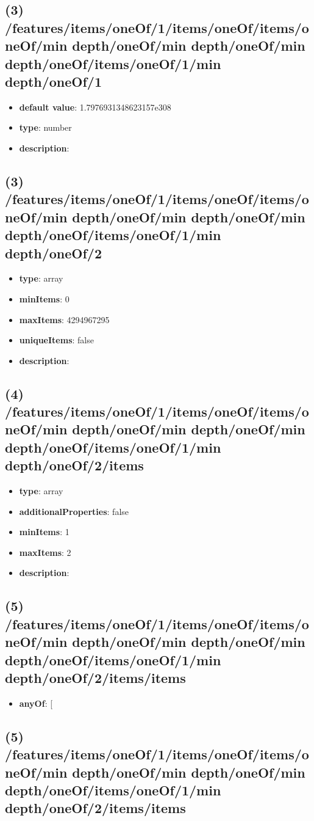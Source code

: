 \subsection{(3) /features/items/oneOf/1/items/oneOf/items/oneOf/min depth/oneOf/min depth/oneOf/min depth/oneOf/items/oneOf/1/min depth/oneOf/1}
\begin{itemize}[leftmargin=3em]\item {\bf default value}: 1.7976931348623157e308
\item {\bf type}: number
\item {\bf description}: 
\end{itemize}\subsection{(3) /features/items/oneOf/1/items/oneOf/items/oneOf/min depth/oneOf/min depth/oneOf/min depth/oneOf/items/oneOf/1/min depth/oneOf/2}
\begin{itemize}[leftmargin=3em]\item {\bf type}: array
\item {\bf minItems}: 0
\item {\bf maxItems}: 4294967295
\item {\bf uniqueItems}: false
\item {\bf description}: 
\end{itemize}\subsection{(4) /features/items/oneOf/1/items/oneOf/items/oneOf/min depth/oneOf/min depth/oneOf/min depth/oneOf/items/oneOf/1/min depth/oneOf/2/items}
\begin{itemize}[leftmargin=4em]\item {\bf type}: array
\item {\bf additionalProperties}: false
\item {\bf minItems}: 1
\item {\bf maxItems}: 2
\item {\bf description}: 
\end{itemize}\subsection{(5) /features/items/oneOf/1/items/oneOf/items/oneOf/min depth/oneOf/min depth/oneOf/min depth/oneOf/items/oneOf/1/min depth/oneOf/2/items/items}
\begin{itemize}[leftmargin=5em]\item {\bf anyOf}: [\end{itemize}\subsection{(5) /features/items/oneOf/1/items/oneOf/items/oneOf/min depth/oneOf/min depth/oneOf/min depth/oneOf/items/oneOf/1/min depth/oneOf/2/items/items}
